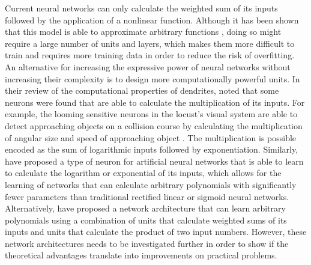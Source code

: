 Current neural networks can only calculate the weighted sum of its inputs
followed by the application of a nonlinear function. Although it has been shown
that this model is able to approximate arbitrary functions \citep{cybenko1989},
doing so might require a large number of units and layers, which makes them more
difficult to train and requires more training data in order to reduce the risk
of overfitting. An alternative for increasing the expressive power of neural
networks without increasing their complexity is to design more computationally
powerful units. In their review of the computational properties of dendrites,
\citet{london2005} noted that some neurons were found that are able to calculate
the multiplication of its inputs. For example, the looming sensitive neurons in
the locust's visual system are able to detect approaching objects on a collision
course by calculating the multiplication of angular size and speed of
approaching object \citep{london2005}. The multiplication is possible encoded as
the sum of logarithmic inputs followed by exponentiation. Similarly,
\citet{godfrey2016} have proposed a type of neuron for artificial neural
networks that is able to learn to calculate the logarithm or exponential of its
inputs, which allows for the learning of networks that can calculate arbitrary
polynomials with significantly fewer parameters than traditional rectified
linear or sigmoid neural networks. Alternatively, \citet{livni2013} have proposed a
network architecture that can learn arbitrary polynomials using a combination of
units that calculate weighted sums of its inputs and units that calculate the
product of two input numbers. However, these network architectures needs to be
investigated further in order to show if the theoretical advantages translate
into improvements on practical problems.
